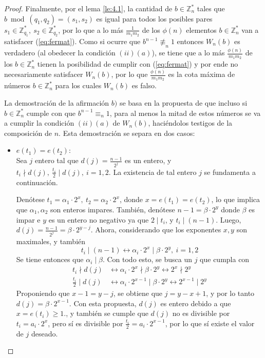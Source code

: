 \documentclass[hidelinks, 12pt]{article}
\newcommand{\Zs}{\mathbb{Z}^*}
\newcommand{\llra}{\longleftrightarrow}
\begin{document}
\begin{proof}
    Finalmente, por el lema \ref{le:4.1}, la cantidad de $b\in\Zs_n$ tales que $b\bmod(q_1,q_2)=(s_1,s_2)$ es igual para todos los posibles pares $s_1\in\Zs_{q_1},~s_2\in\Zs_{q_2}$, por lo que a lo más $\frac{1}{m_1m_2}$ de los $\phi(n)$ elementos $b\in\Zs_n$ van a satisfacer (\ref{eq:fermat}). Como si ocurre que $b^{n-1}\not\equiv_n 1$ entonces $W_n(b)$ es verdadero (al obedecer la condición $(ii)(a)$), se tiene que a lo más $\frac{\phi(n)}{m_1m_2}$ de los $b\in\Zs_n$ tienen la posibilidad de cumplir con (\ref{eq:fermat}) y por ende no necesariamente satisfacer $W_n(b)$, por lo que $\frac{\phi(n)}{m_1m_2}$ es la cota máxima de números $b\in\Zs_n$ para los cuales $W_n(b)$ es falso.

    La demostración de la afirmación $b)$ se basa en la propuesta de que incluso si $b\in\Zs_n$ cumple con que $b^{n-1}\equiv_n 1$, para al menos la mitad de estos números se va a cumplir la condición $(ii)(a)$ de $W_n(b)$, haciéndolos testigos de la composición de $n$. Esta demostración se separa en dos casos:
    \begin{itemize}
        \item $e(t_1)=e(t_2)$: \\
        Sea $j$ entero tal que $d(j)=\frac{n-1}{2^j}$ es un entero, y $t_i\nmid d(j),~\frac{t_i}{2}\mid d(j),~i=1,2$. La existencia de tal entero $j$ se fundamenta a continuación.
        
        Denótese $t_1=\alpha_1\cdot 2^x,~t_2=\alpha_2\cdot 2^x$, donde $x=e(t_1)=e(t_2)$, lo que implica que $\alpha_1,\alpha_2$ son enteros impares. También, denótese $n-1=\beta\cdot 2^y$ donde $\beta$ es impar e $y$ es un entero no negativo ya que $2\mid t_i$, y $t_i\mid(n-1)$. Luego, $d(j)=\frac{n-1}{2^j}=\beta\cdot 2^{y-j}$. Ahora, considerando que los exponentes $x,y$ son maximales, y también
        \[t_i\mid(n-1)\llra\alpha_i\cdot 2^x\mid\beta\cdot 2^y,~i=1,2\] 
        Se tiene entonces que $\alpha_i\mid\beta$. Con todo esto, se busca un $j$ que cumpla con
        \begin{align*}
            t_i\nmid d(j)&\llra\alpha_i\cdot 2^x\nmid\beta\cdot 2^y\llra 2^x\nmid 2^y \\
            \frac{t_i}{2}\mid d(j)&\llra\alpha_i\cdot 2^{x-1}\mid\beta\cdot 2^y\llra 2^{x-1}\mid 2^y
        \end{align*}
        Proponiendo que $x-1=y-j$, se obtiene que $j=y-x+1$, y por lo tanto $d(j)=\beta\cdot 2^{x-1}$. Con esta propuesta, $d(j)$ es entero debido a que $x=e(t_i)\geq 1$., y también se cumple que $d(j)$ no es divisible por $t_i=a_i\cdot 2^x$, pero sí es divisible por $\frac{t_i}{2}=a_i\cdot 2^{x-1}$, por lo que sí existe el valor de $j$ deseado.


\end{itemize}
\end{proof}
\end{document}

